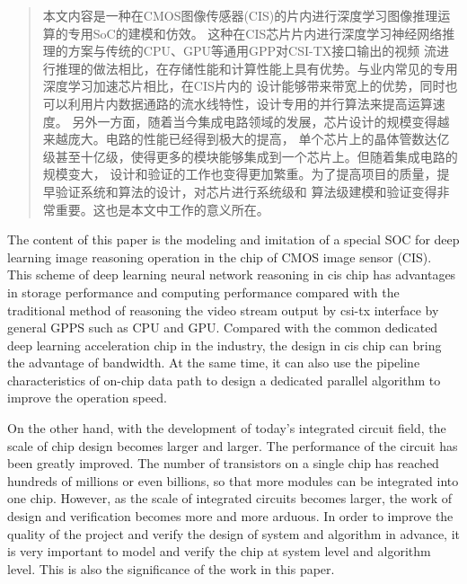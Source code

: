 
\begin{abstract}
  本文内容是一种在CMOS图像传感器(CIS)的片内进行深度学习图像推理运算的专用SoC的建模和仿效。
  这种在CIS芯片片内进行深度学习神经网络推理的方案与传统的CPU、GPU等通用GPP对CSI-TX接口输出的视频
  流进行推理的做法相比，在存储性能和计算性能上具有优势。与业内常见的专用深度学习加速芯片相比，在CIS片内的
  设计能够带来带宽上的优势，同时也可以利用片内数据通路的流水线特性，设计专用的并行算法来提高运算速度。
  另外一方面，随着当今集成电路领域的发展，芯片设计的规模变得越来越庞大。电路的性能已经得到极大的提高，
  单个芯片上的晶体管数达亿级甚至十亿级，使得更多的模块能够集成到一个芯片上。但随着集成电路的规模变大，
  设计和验证的工作也变得更加繁重。为了提高项目的质量，提早验证系统和算法的设计，对芯片进行系统级和
  算法级建模和验证变得非常重要。这也是本文中工作的意义所在。


\end{abstract}

\begin{abstract*}
  The content of this paper is the modeling and imitation of a special SOC for deep learning image reasoning operation in the chip of CMOS image sensor (CIS).
  This scheme of deep learning neural network reasoning in cis chip has advantages in storage performance and computing performance compared with the traditional method of reasoning the video stream output by csi-tx interface by general GPPS such as CPU and GPU. Compared with the common dedicated deep learning acceleration chip in the industry, the design in cis chip can bring the advantage of bandwidth. At the same time, it can also use the pipeline characteristics of on-chip data path to design a dedicated parallel algorithm to improve the operation speed.  

  On the other hand, with the development of today's integrated circuit field, the scale of chip design becomes larger and larger. The performance of the circuit has been greatly improved. The number of transistors on a single chip has reached hundreds of millions or even billions, so that more modules can be integrated into one chip.
  However, as the scale of integrated circuits becomes larger, the work of design and verification becomes more and more arduous. In order to improve the quality of the project and verify the design of system and algorithm in advance, it is very important to model and verify the chip at system level and algorithm level. This is also the significance of the work in this paper.
\end{abstract*}
